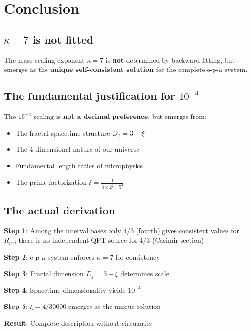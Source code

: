 		\section{Conclusion}
	
	\subsection{$\kappa = 7$ is not fitted}
	
	The mass-scaling exponent $\kappa = 7$ is \textbf{not} determined by backward fitting, but emerges as the \textbf{unique self-consistent solution} for the complete e-p-$\mu$ system.
	
	\subsection{The fundamental justification for $10^{-4}$}
	
	The $10^{-4}$ scaling is \textbf{not a decimal preference}, but emerges from:
	\begin{itemize}
		\item The fractal spacetime structure $D_f = 3 - \xi$
		\item The 4-dimensional nature of our universe
		\item Fundamental length ratios of microphysics
		\item The prime factorization $\xi = \frac{1}{3 \times 2^2 \times 5^4}$
	\end{itemize}
	
	\subsection{The actual derivation}
	
	\begin{tcolorbox}[colback=green!5!white,colframe=green!75!black,title={Fundamental Derivation}]
		\textbf{Step 1}: Among the interval bases only $4/3$ (fourth) gives consistent values for $R_{pe}$; there is no independent QFT source for $4/3$ (Casimir section)
		
		\textbf{Step 2}: e-p-$\mu$ system enforces $\kappa = 7$ for consistency
		
		\textbf{Step 3}: Fractal dimension $D_f = 3 - \xi$ determines scale
		
		\textbf{Step 4}: Spacetime dimensionality yields $10^{-4}$
		
		\textbf{Step 5}: $\xi = 4/30000$ emerges as the unique solution
		
		\textbf{Result}: Complete description without circularity
	\end{tcolorbox}
	
